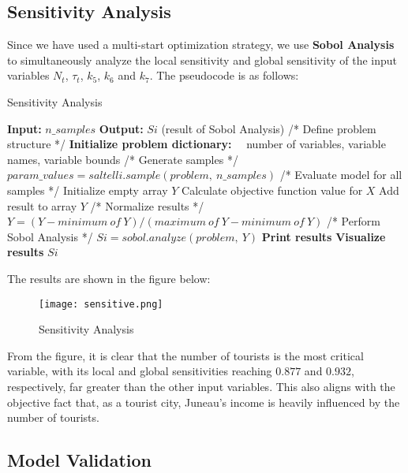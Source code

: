 \documentclass[12pt]{article}  %
\begin{document}
\subsection{Sensitivity Analysis}
Since we have used a multi-start optimization strategy, we use \textbf{Sobol Analysis} to simultaneously analyze the local sensitivity and global sensitivity of the input variables $N_t$, $\tau_t$, $k_5$, $k_6$ and $k_7$. The pseudocode is as follows:
\begin{algorithm}
	\caption{Sensitivity Analysis}
	\begin{algorithmic}[1]
		\STATE \textbf{Input:} $n\_samples$
		\STATE \textbf{Output:} $Si$ (result of Sobol Analysis)
		\vspace{0.2cm}
		\STATE /* Define problem structure */
		\STATE \textbf{Initialize problem dictionary:}
		\STATE $\quad$number of variables, variable names, variable bounds
		\STATE /* Generate samples */
		\STATE $param\_values = saltelli.sample(problem,\ n\_samples)$
		\STATE /* Evaluate model for all samples */
		\STATE Initialize empty array $Y$
		\STATE Calculate objective function value for $X$
		\STATE Add result to array $Y$
		\ENDFOR
		\STATE /* Normalize results */
		\STATE $Y = (Y - minimum\ of\ Y) / (maximum\ of\ Y - minimum\ of\ Y)$
		\STATE /* Perform Sobol Analysis */
		\STATE $Si=sobol.analyze(problem,\ Y)$
		\vspace{0.2cm}
		\STATE \textbf{Print results}
		\STATE \textbf{Visualize results}
		\vspace{0.2cm}
		\RETURN $Si$
	\end{algorithmic}
\end{algorithm}

The results are shown in the figure below:
\begin{figure}[H]
	\centering
	\texttt{[image: sensitive.png]}
	\caption{Sensitivity Analysis}\label{fig:sensitivity}
\end{figure}

From the figure, it is clear that the number of tourists is the most critical variable, with its local and global sensitivities reaching $0.877$ and $0.932$, respectively, far greater than the other input variables. This also aligns with the objective fact that, as a tourist city, Juneau's income is heavily influenced by the number of tourists.

\subsection{Model Validation}
\end{document}
